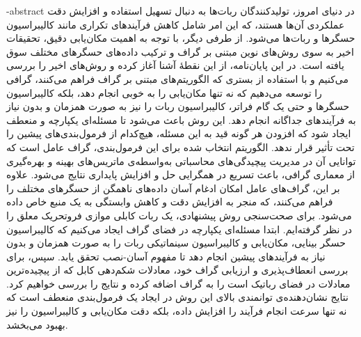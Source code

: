 \fa-abstract{
در دنیای امروز، تولیدکنندگان ربات‌ها به دنبال تسهیل استفاده و افزایش دقت عملکردی آن‌ها هستند، که این امر شامل کاهش فرآیندهای تکراری مانند کالیبراسیون حسگرها و ربات‌ها می‌شود. از طرفی دیگر، با توجه به اهمیت مکان‌یابی دقیق، تحقیقات اخیر به سوی روش‌های نوین مبتنی بر گراف و ترکیب داده‌های حسگرهای مختلف سوق یافته است.
در این پایان‌نامه، از این نقطهٔ آشنا آغاز کرده و روش‌های اخیر را بررسی می‌کنیم و با استفاده از بستری که الگوریتم‌های مبتنی بر گراف فراهم می‌کنند، گرافی را توسعه می‌دهیم که نه تنها مکان‌یابی را به خوبی انجام دهد، بلکه کالیبراسیون حسگرها و حتی یک گام فراتر، کالیبراسیون ربات را نیز به صورت همزمان و بدون نیاز به فرآیندهای جداگانه انجام دهد. این روش باعث می‌شود تا مسئله‌ای یکپارچه و منعطف ایجاد شود که افزودن هر گونه قید به این مسئله، هیچ‌کدام از فرمول‌بندی‌های پیشین را تحت تأثیر قرار ندهد.
الگوریتم انتخاب شده برای این فرمول‌بندی، گراف عامل است که توانایی آن در مدیریت پیچیدگی‌های محاسباتی به‌واسطه‌ی ماتریس‌های بهینه و بهره‌گیری از معماری گرافی، باعث تسریع در همگرایی حل و افزایش پایداری نتایج می‌شود. علاوه بر این، گراف‌های عامل امکان ادغام آسان داده‌های ناهمگن از حسگرهای مختلف را فراهم می‌کنند، که منجر به افزایش دقت و کاهش وابستگی به یک منبع خاص داده می‌شود.
برای صحت‌سنجی روش پیشنهادی، یک ربات کابلی موازی فروتحریک معلق را در نظر گرفته‌ایم. ابتدا مسئله‌ای یکپارچه در فضای گراف ایجاد می‌کنیم که کالیبراسیون حسگر بینایی، مکان‌یابی و کالیبراسیون سینماتیکی ربات را به صورت همزمان و بدون نیاز به فرآیندهای پیشین انجام دهد تا مفهوم آسان-نصب تحقق یابد. سپس، برای بررسی انعطاف‌پذیری و ارزیابی گراف خود، معادلات شکم‌دهی کابل که از پیچیده‌ترین معادلات در فضای رباتیک است را به گراف اضافه کرده و نتایج را بررسی خواهیم کرد. نتایج نشان‌دهنده‌ی توانمندی بالای این روش در ایجاد یک فرمول‌بندی منعطف است که نه تنها سرعت انجام فرآیند را افزایش داده، بلکه دقت مکان‌یابی و کالیبراسیون را نیز بهبود می‌بخشد.
}
